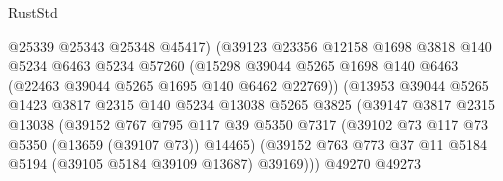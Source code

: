 \begin{lexlean}{RustStd}
\begin{coremodule}
                                    @25339
                                    @25343
                                    @25348
                                    @45417)
                                  (@39123
                                    @23356
                                    @12158
                                    @1698
                                    @3818
                                    @140
                                    @5234
                                    @6463
                                    @5234
                                    @57260
                                    (@15298
                                      @39044
                                      @5265
                                      @1698
                                      @140
                                      @6463
                                      (@22463 @39044 @5265 @1695 @140 @6462 @22769))
                                    (@13953
                                      @39044
                                      @5265
                                      @1423
                                      @3817
                                      @2315
                                      @140
                                      @5234
                                      @13038
                                      @5265
                                      @3825
                                      (@39147
                                        @3817
                                        @2315
                                        @13038
                                        (@39152
                                          @767
                                          @795
                                          @117
                                          @39
                                          @5350
                                          @7317
                                          (@39102 @73 @117 @73 @5350 (@13659 (@39107 @73)) @14465)
                                          (@39152
                                            @763
                                            @773
                                            @37
                                            @11
                                            @5184
                                            @5194
                                            (@39105 @5184 @39109 @13687)
                                            @39169)))
                                      @49270
                                      @49273

\end{coremodule}
\end{lexlean}
